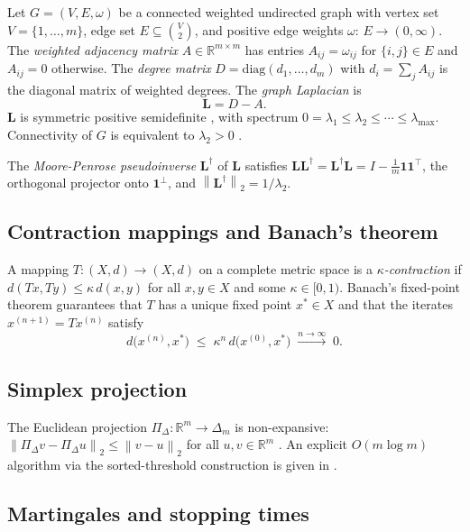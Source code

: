 \documentclass[twocolumn,11pt,a4paper]{article}
\theoremstyle{plain}
\theoremstyle{definition}
\theoremstyle{remark}
\newcommand{\R}{\mathbb{R}}
\newcommand{\Lop}{\mathbf{L}}        %
\newcommand{\Lpinv}{\mathbf{L}^{\dagger}} %
\newcommand{\proj}{\Pi_{\Delta}}     %
\newcommand{\Deltam}{\Delta_m}
\newcommand{\lam}{\lambda}
\newcommand{\lamtwo}{\lambda_2}
\newcommand{\lammax}{\lambda_{\max}}
\newcommand{\norm}[1]{\left\|#1\right\|}
\newcommand{\one}{\mathbf{1}}
\begin{document}
Let $G=(V,E,\omega)$ be a connected weighted undirected graph with
vertex set $V=\{1,\dots,m\}$, edge set $E\subseteq\binom{V}{2}$, and
positive edge weights $\omega:\,E\to(0,\infty)$.  The \emph{weighted
adjacency matrix} $A\in\R^{m\times m}$ has entries
$A_{ij}=\omega_{ij}$ for $\{i,j\}\in E$ and $A_{ij}=0$ otherwise.
The \emph{degree matrix} $D=\mathrm{diag}(d_1,\dots,d_m)$ with
$d_i=\sum_j A_{ij}$ is the diagonal matrix of weighted degrees.  The
\emph{graph Laplacian} is
\begin{equation}
  \Lop = D - A.
  \label{eq:laplacian}
\end{equation}
$\Lop$ is symmetric positive semidefinite \cite{Chung1997}, with
spectrum $0=\lam_1\le\lam_2\le\cdots\le\lammax$.  Connectivity of $G$
is equivalent to $\lamtwo>0$ \cite{Fiedler1973,Mohar1991}.

The \emph{Moore-Penrose pseudoinverse} $\Lpinv$ \cite{Penrose1955} of
$\Lop$ satisfies $\Lop\Lpinv=\Lpinv\Lop=I-\frac{1}{m}\one\one^{\top}$,
the orthogonal projector onto $\one^{\perp}$, and
$\norm{\Lpinv}_2=1/\lamtwo$.

\subsection{Contraction mappings and Banach's theorem}
\label{sec:banach}

A mapping $T:(X,d)\to(X,d)$ on a complete metric space is a
\emph{$\kappa$-contraction} if $d(Tx,Ty)\le\kappa\,d(x,y)$ for all
$x,y\in X$ and some $\kappa\in[0,1)$.  Banach's fixed-point theorem
\cite{Banach1922} guarantees that $T$ has a unique fixed point
$x^*\in X$ and that the iterates $x^{(n+1)}=Tx^{(n)}$ satisfy
\begin{equation}
  d\bigl(x^{(n)},x^*\bigr) \;\le\; \kappa^n\,d\bigl(x^{(0)},x^*\bigr)
  \;\xrightarrow{n\to\infty}\; 0.
  \label{eq:banach_rate}
\end{equation}

\subsection{Simplex projection}
\label{sec:simplexproj}

The Euclidean projection $\proj:\R^m\to\Deltam$ is non-expansive:
$\norm{\proj v-\proj u}_2\le\norm{v-u}_2$ for all $u,v\in\R^m$
\cite{BauschkeCombettes2011}.  An explicit $O(m\log m)$ algorithm via
the sorted-threshold construction is given in
\cite{BauschkeCombettes2011}.

\subsection{Martingales and stopping times}
\label{sec:martingales}
\end{document}
